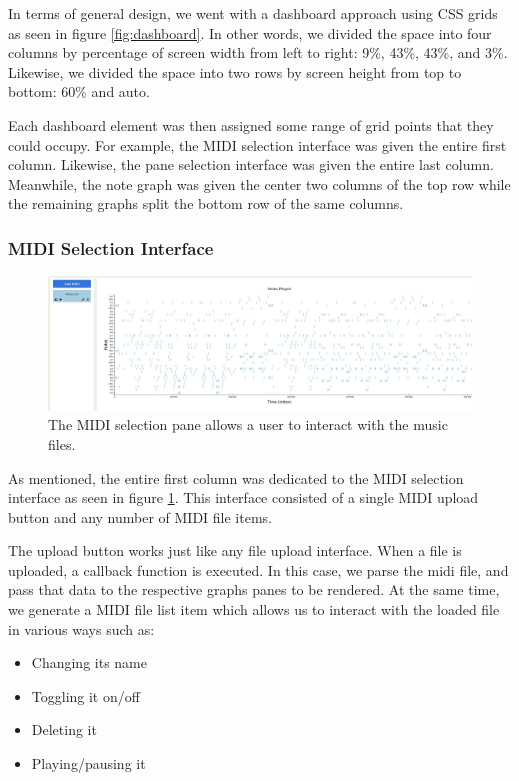 \documentclass[journal]{vgtc}                %
\begin{document}
In terms of general design, we went with a dashboard approach using CSS grids
as seen in figure \ref{fig:dashboard}. In other words, we divided the space into
four columns by percentage of screen width from left to right: 9\%, 43\%, 43\%,
and 3\%. Likewise, we divided the space into two rows by screen height from top
to bottom: 60\% and auto.

Each dashboard element was then assigned some range of grid points that they
could occupy. For example, the MIDI selection interface was given the entire
first column. Likewise, the pane selection interface was given the entire
last column. Meanwhile, the note graph was given the center two columns of
the top row while the remaining graphs split the bottom row of the same
columns.

\subsubsection{MIDI Selection Interface}

\begin{figure}[h]
  \centering
  \includegraphics[width=\columnwidth]{midi-selection-single-track}
  \caption{The MIDI selection pane allows a user to interact with the music files.}
  \label{fig:midi-selection}
\end{figure}

As mentioned, the entire first column was dedicated to the MIDI selection
interface as seen in figure \ref{fig:midi-selection}. This interface consisted
of a single MIDI upload button and any number of MIDI file items.

The upload button works just like any file upload interface. When a file is
uploaded, a callback function is executed. In this case, we parse the midi file,
and pass that data to the respective graphs panes to be rendered. At the same
time, we generate a MIDI file list item which allows us to interact with the
loaded file in various ways such as:

\begin{itemize}
  \item Changing its name
  \item Toggling it on/off
  \item Deleting it
  \item Playing/pausing it
\end{itemize}
\end{document}
